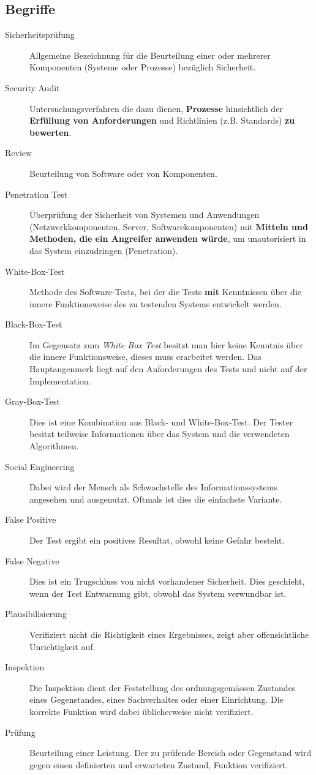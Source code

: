 \subsection{Begriffe}

\begin{description}
	\item[Sicherheitsprüfung] Allgemeine Bezeichnung für die Beurteilung einer oder mehrerer Komponenten (Systeme oder Prozesse) bezüglich Sicherheit.
	\item[Security Audit] Untersuchungsverfahren die dazu dienen, \textbf{Prozesse} hinsichtlich der \textbf{Erfüllung von Anforderungen} und Richtlinien (z.B. Standards) \textbf{zu bewerten}.
	\item[Review] Beurteilung von Software oder von Komponenten.
	\item[Penetration Test] Überprüfung der Sicherheit von Systemen und Anwendungen (Netzwerkkomponenten, Server, Softwarekomponenten) mit \textbf{Mitteln und Methoden, die ein Angreifer anwenden würde}, um unautorisiert in das System einzudringen (Penetration).
	\item[White-Box-Test] Methode des Software-Tests, bei der die Tests \textbf{mit} Kenntnissen über die innere Funktionsweise des zu testenden Systems entwickelt werden.
	\item[Black-Box-Test] Im Gegensatz zum \textit{White Box Test} besitzt man hier keine Kenntnis über die innere Funktionsweise, dieses muss erarbeitet werden. Das Hauptaugenmerk liegt auf den Anforderungen des Tests und nicht auf der Implementation.
	\item[Gray-Box-Test] Dies ist eine Kombination aus Black- und White-Box-Test. Der Tester besitzt teilweise Informationen über das System und die verwendeten Algorithmen.
	\item[Social Engineering] Dabei wird der Mensch als Schwachstelle des Informationssystems angesehen und ausgenutzt. Oftmals ist dies die einfachste Variante.
	\item[False Positive] Der Test ergibt ein positives Resultat, obwohl keine Gefahr besteht.
	\item[False Negative] Dies ist ein Trugschluss von nicht vorhandener Sicherheit. Dies geschieht, wenn der Test Entwarnung gibt, obwohl das System verwundbar ist.
	\item[Plausibilisierung] Verifiziert nicht die Richtigkeit eines Ergebnisses, zeigt aber offensichtliche Unrichtigkeit auf.
	\item[Inspektion] Die Inspektion dient der Feststellung des ordnungsgemässen Zustandes eines Gegenstandes, eines Sachverhaltes oder einer Einrichtung. Die korrekte Funktion wird dabei üblicherweise nicht verifiziert.
	\item[Prüfung] Beurteilung einer Leistung. Der zu prüfende Bereich oder Gegenstand wird gegen einen definierten und erwarteten Zustand, Funktion verifiziert.
\end{description}


